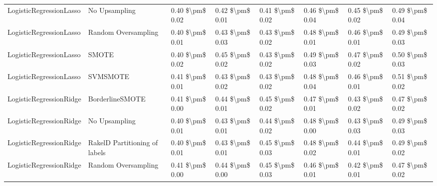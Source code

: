 \begin{tabular}{llllllll}
        LogisticRegressionLasso &                 No Upsampling & 0.40 \$\textbackslash pm\$ 0.02 &           0.42 \$\textbackslash pm\$ 0.01 &       0.41 \$\textbackslash pm\$ 0.02 &        0.46 \$\textbackslash pm\$ 0.04 &                         0.45 \$\textbackslash pm\$ 0.02 &     0.49 \$\textbackslash pm\$ 0.04 \\
        LogisticRegressionLasso &           Random Oversampling & 0.40 \$\textbackslash pm\$ 0.01 &           0.43 \$\textbackslash pm\$ 0.03 &       0.43 \$\textbackslash pm\$ 0.02 &        0.48 \$\textbackslash pm\$ 0.01 &                         0.46 \$\textbackslash pm\$ 0.01 &     0.49 \$\textbackslash pm\$ 0.03 \\
        LogisticRegressionLasso &                         SMOTE & 0.40 \$\textbackslash pm\$ 0.02 &           0.45 \$\textbackslash pm\$ 0.02 &       0.43 \$\textbackslash pm\$ 0.02 &        0.49 \$\textbackslash pm\$ 0.03 &                         0.47 \$\textbackslash pm\$ 0.02 &     0.50 \$\textbackslash pm\$ 0.03 \\
        LogisticRegressionLasso &                      SVMSMOTE & 0.41 \$\textbackslash pm\$ 0.01 &           0.43 \$\textbackslash pm\$ 0.02 &       0.43 \$\textbackslash pm\$ 0.02 &        0.48 \$\textbackslash pm\$ 0.04 &                         0.46 \$\textbackslash pm\$ 0.01 &     0.51 \$\textbackslash pm\$ 0.02 \\
        LogisticRegressionRidge &               BorderlineSMOTE & 0.41 \$\textbackslash pm\$ 0.00 &           0.44 \$\textbackslash pm\$ 0.01 &       0.45 \$\textbackslash pm\$ 0.02 &        0.47 \$\textbackslash pm\$ 0.01 &                         0.43 \$\textbackslash pm\$ 0.02 &     0.47 \$\textbackslash pm\$ 0.02 \\
        LogisticRegressionRidge &                 No Upsampling & 0.40 \$\textbackslash pm\$ 0.01 &           0.43 \$\textbackslash pm\$ 0.01 &       0.44 \$\textbackslash pm\$ 0.02 &        0.48 \$\textbackslash pm\$ 0.00 &                         0.43 \$\textbackslash pm\$ 0.03 &     0.49 \$\textbackslash pm\$ 0.03 \\
        LogisticRegressionRidge & RakelD Partitioning of labels & 0.40 \$\textbackslash pm\$ 0.01 &           0.43 \$\textbackslash pm\$ 0.01 &       0.45 \$\textbackslash pm\$ 0.03 &        0.48 \$\textbackslash pm\$ 0.02 &                         0.44 \$\textbackslash pm\$ 0.01 &     0.49 \$\textbackslash pm\$ 0.02 \\
        LogisticRegressionRidge &           Random Oversampling & 0.41 \$\textbackslash pm\$ 0.00 &           0.44 \$\textbackslash pm\$ 0.00 &       0.45 \$\textbackslash pm\$ 0.03 &        0.46 \$\textbackslash pm\$ 0.01 &                         0.42 \$\textbackslash pm\$ 0.01 &     0.47 \$\textbackslash pm\$ 0.02 \\

\end{tabular}

